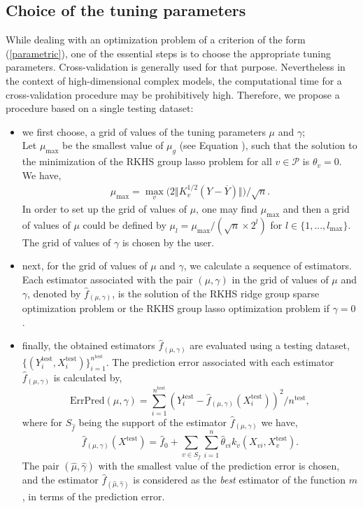 \subsection{Choice of the tuning parameters}\label{subsec:Err} 
While dealing with an optimization problem of a criterion of the form (\ref{parametric}), one of the essential steps is to choose the appropriate tuning parameters. Cross-validation is generally used for that purpose.
Nevertheless in the context of high-dimensional complex models, the
computational time for a cross-validation procedure may be prohibitively
high. Therefore, we propose a procedure based on a single testing dataset:
\begin{itemize}
\item we first choose, a grid of values of the tuning parameters $\mu$ and $\gamma$;\\
Let $\mu_{\text{max}}$ be the smallest value of $\mu_g$ (see Equation ), such that the solution to the minimization of the RKHS group lasso problem for all $v\in\mathcal{P}$ is $\theta_v=0$. We have, 
\begin{align}
\label{maxmu}
\mu_{\text{max}}=\max_v\Big(2\Vert K_v^{1/2}(Y-\overline{Y})\Vert\Big)/\sqrt{n}.
\end{align}
In order to set up the grid of values of $\mu$, one may find $\mu_{\text{max}}$ and then a grid of values of $\mu$ could be defined by $\mu_l=\mu_{\text{max}}/(\sqrt{n}\times2^{l})$ for $l\in\{1,...,l_{\text{max}}\}.$
The grid of values of $\gamma$ is chosen by the user.  

\item next, for the grid of values of $\mu$ and $\gamma$, we calculate a sequence of estimators. Each estimator associated with the pair $(\mu,\gamma)$ in the grid of values of $\mu$ and $\gamma$, denoted by $\widehat{f}_{(\mu,\gamma)}$, is the solution of the RKHS ridge group sparse optimization problem or the RKHS group lasso optimization problem if $\gamma=0$. 
\item finally, the obtained estimators $\widehat{f}_{(\mu,\gamma)}$ are evaluated using a testing dataset, $\{(Y^{\text{test}}_i,X^{\text{test}}_i)\}_{i=1}^{n^{\text{test}}}$. The prediction error associated with each estimator $\widehat{f}_{(\mu,\gamma)}$ is calculated by,
$$\text{ErrPred}(\mu,\gamma)=\sum_{i=1}^{n^{\text{test}}}(Y^{\text{test}}_i-\widehat{f}_{(\mu,\gamma)}(X^{\text{test}}_i))^2/n^{\text{test}},$$
where for $S_{\widehat{f}}$ being the support of the estimator $\widehat{f}_{(\mu,\gamma)}$ we have, 
$$\widehat{f}_{(\mu,\gamma)}(X^{\text{test}})=\widehat{f}_0+\sum_{v\in S_{\widehat{f}}}\sum_{i=1}^n\widehat{\theta}_{vi}k_v(X_{vi},X^{\text{test}}_v).$$
The pair $(\widehat{\mu},\widehat{\gamma})$ with the smallest value of the prediction error is chosen, and the estimator $\widehat{f}_{(\widehat{\mu},\widehat{\gamma})}$ is considered as the \textit{best} estimator of the function $m$, in terms of the prediction error.
\end{itemize}

